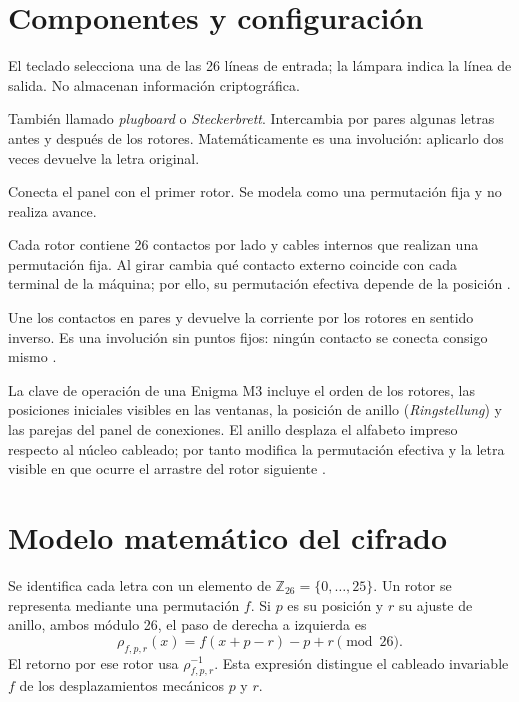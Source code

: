 \documentclass[letterpaper,12pt]{article}
\begin{document}
\section{Componentes y configuración}
\begin{description}[style=nextline,leftmargin=35mm,font=\normalfont\bfseries]
  \item[Teclado y lámparas] El teclado selecciona una de las 26 líneas de entrada; la lámpara indica la línea de salida. No almacenan información criptográfica.
  \item[Panel de conexiones] También llamado \emph{plugboard} o \emph{Steckerbrett}. Intercambia por pares algunas letras antes y después de los rotores. Matemáticamente es una involución: aplicarlo dos veces devuelve la letra original.
  \item[Rueda de entrada] Conecta el panel con el primer rotor. Se modela como una permutación fija y no realiza avance.
  \item[Rotores] Cada rotor contiene 26 contactos por lado y cables internos que realizan una permutación fija. Al girar cambia qué contacto externo coincide con cada terminal de la máquina; por ello, su permutación efectiva depende de la posición \cite{friedman-lectures}.
  \item[Reflector] Une los contactos en pares y devuelve la corriente por los rotores en sentido inverso. Es una involución sin puntos fijos: ningún contacto se conecta consigo mismo \cite{friedman-lectures}.
\end{description}

La clave de operación de una Enigma M3 incluye el orden de los rotores, las posiciones iniciales visibles en las ventanas, la posición de anillo (\emph{Ringstellung}) y las parejas del panel de conexiones. El anillo desplaza el alfabeto impreso respecto al núcleo cableado; por tanto modifica la permutación efectiva y la letra visible en que ocurre el arrastre del rotor siguiente \cite{cornell-enigma}.

\section{Modelo matemático del cifrado}
Se identifica cada letra con un elemento de $\mathbb{Z}_{26}=\{0,\ldots,25\}$. Un rotor se representa mediante una permutación $f$. Si $p$ es su posición y $r$ su ajuste de anillo, ambos módulo 26, el paso de derecha a izquierda es
\[
  \rho_{f,p,r}(x)=f(x+p-r)-p+r \pmod {26}.
\]
El retorno por ese rotor usa $\rho_{f,p,r}^{-1}$. Esta expresión distingue el cableado invariable $f$ de los desplazamientos mecánicos $p$ y $r$.
\end{document}
